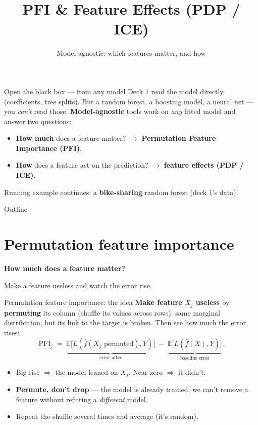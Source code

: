 \documentclass[aspectratio=169]{beamer}
\title{PFI \& Feature Effects (PDP / ICE)}
\subtitle{Model-agnostic: which features matter, and how}
\date{}
\begin{document}
\begin{frame}{Open the black box --- from any model}
  Deck 1 read the model directly (coefficients, tree splits). But a random forest, a boosting
  model, a neural net --- you \emph{can't} read those.
  \vfill
  \textbf{Model-agnostic} tools work on \emph{any} fitted model and answer two questions:
  \begin{itemize}\small
    \item \textbf{How much} does a feature matter? $\to$ \textbf{Permutation Feature Importance (PFI)}.
    \item \textbf{How} does a feature act on the prediction? $\to$ \textbf{feature effects (PDP / ICE)}.
  \end{itemize}
  \vfill
  \footnotesize Running example continues: a \textbf{bike-sharing} random forest (deck 1's data).
\end{frame}

\begin{frame}{Outline}
  \tableofcontents
\end{frame}

\section{Permutation feature importance}

\begin{frame}[plain]
  \vfill
  \begin{center}
    {\Large\color{popblue}\textbf{How much does a feature matter?}}\\[0.9em]
    \begin{minipage}{0.82\textwidth}\centering\small
      Make a feature useless and watch the error rise.
    \end{minipage}
  \end{center}
  \vfill
\end{frame}

\begin{frame}{Permutation feature importance: the idea}
  \textbf{Make feature $X_j$ useless} by \textbf{permuting} its column (shuffle its values across
  rows): same marginal distribution, but its link to the target is broken. Then see how much the
  error rises:
  \[
    \mathrm{PFI}_j \;=\; \underbrace{\mathbb{E}\big[L(\hat f(\text{$X_j$ permuted}), Y)\big]}_{\text{error after}}
    \;-\; \underbrace{\mathbb{E}\big[L(\hat f(X), Y)\big]}_{\text{baseline error}}.
  \]
  \begin{itemize}\small
    \item Big rise $\Rightarrow$ the model leaned on $X_j$. Near zero $\Rightarrow$ it didn't.
    \item \textbf{Permute, don't drop} --- the model is already trained; we can't remove a feature
      without refitting a \emph{different} model.
    \item Repeat the shuffle several times and average (it's random).
  \end{itemize}
\end{frame}
\end{document}
